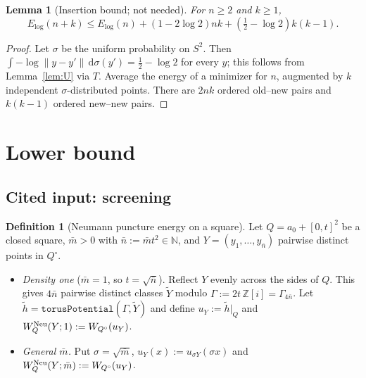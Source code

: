 \documentclass[11pt]{article}
\newtheorem{lemma}[theorem]{Lemma}
\theoremstyle{definition}
\newtheorem{definition}[theorem]{Definition}
\theoremstyle{remark}
\newcommand{\N}{\mathbb N}
\newcommand{\Z}{\mathbb Z}
\newcommand{\dd}{\,\mathrm d}
\begin{document}
\begin{lemma}[Insertion bound; not needed]\label{lem:insertion}
For $n\ge2$ and $k\ge1$,
\[
E_{\log}(n+k)\le E_{\log}(n)+(1-2\log2)nk+(\tfrac12-\log2)k(k-1).
\]
\end{lemma}
\begin{proof}
Let $\sigma$ be the uniform probability on $S^2$. Then $\int-\log\|y-y'\|\dd\sigma(y')=\tfrac12-\log2$
for every $y$; this follows from Lemma~\ref{lem:U} via $T$. Average the energy of a minimizer for $n$, augmented by $k$ independent
$\sigma$-distributed points. There are $2nk$ ordered old--new pairs and $k(k-1)$ ordered new--new
pairs.
\end{proof}

\section{Lower bound}\label{sec:LB}

\subsection{Cited input: screening}

\begin{definition}[Neumann puncture energy on a square]\label{def:neumann}
Let $Q=a_0+[0,t]^2$ be a closed square, $\bar m>0$ with $\bar n:=\bar mt^2\in\N$, and
$Y=(y_1,\dots,y_{\bar n})$ pairwise distinct points in $Q^\circ$.
\begin{itemize}[leftmargin=*]
\item \emph{Density one} ($\bar m=1$, so $t=\sqrt{\bar n}$). Reflect $Y$ evenly across the sides
  of $Q$. This gives $4\bar n$ pairwise distinct classes $\tilde Y$ modulo
  $\Gamma:=2t\,\Z[i]=\Gamma_{4\bar n}$. Let
  $\tilde h=\mathtt{torusPotential}(\Gamma,\tilde Y)$ and define $u_Y:=\tilde h|_Q$ and
  $W^{\rm Neu}_Q(Y;1):=W_{Q^\circ}(u_Y)$.
\item \emph{General $\bar m$.} Put $\sigma=\sqrt{\bar m}$, $u_Y(x):=u_{\sigma Y}(\sigma x)$ and
  $W^{\rm Neu}_Q(Y;\bar m):=W_{Q^\circ}(u_Y)$.
\end{itemize}
\end{definition}
\end{document}
